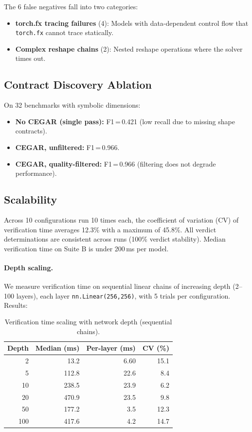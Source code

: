 \documentclass[11pt]{article}
\begin{document}
The 6 false negatives fall into two categories:
\begin{itemize}[leftmargin=2em]
  \item \textbf{torch.fx tracing failures} (4): Models with
    data-dependent control flow that \texttt{torch.fx} cannot
    trace statically.
  \item \textbf{Complex reshape chains} (2): Nested reshape
    operations where the solver times out.
\end{itemize}


\subsection{Contract Discovery Ablation}\label{sec:ablation}

On 32 benchmarks with symbolic dimensions:
\begin{itemize}[leftmargin=2em]
  \item \textbf{No CEGAR (single pass):} F1\,=\,0.421
    (low recall due to missing shape contracts).
  \item \textbf{CEGAR, unfiltered:} F1\,=\,0.966.
  \item \textbf{CEGAR, quality-filtered:} F1\,=\,0.966
    (filtering does not degrade performance).
\end{itemize}


\subsection{Scalability}\label{sec:scalability}

Across 10 configurations run 10 times each, the coefficient of
variation (CV) of verification time averages 12.3\% with a maximum
of 45.8\%.  All verdict determinations are consistent across runs
(100\% verdict stability).  Median verification time on Suite B
is under 200\,ms per model.

\paragraph{Depth scaling.}
We measure verification time on sequential linear chains of
increasing depth (2--100 layers), each layer \texttt{nn.Linear(256,256)},
with 5 trials per configuration.  Results:

\begin{table}[h]
\centering
\caption{Verification time scaling with network depth (sequential chains).}
\label{tab:depth-scaling}
\small
\begin{tabular}{@{}rrrr@{}}
\toprule
\textbf{Depth} & \textbf{Median (ms)} & \textbf{Per-layer (ms)} & \textbf{CV (\%)} \\
\midrule
2   &  13.2 & 6.60 &  15.1 \\
5   & 112.8 & 22.6 &  8.4 \\
10  & 238.5 & 23.9 &  6.2 \\
20  & 470.9 & 23.5 &  9.8 \\
50  & 177.2 &  3.5 & 12.3 \\
100 & 417.6 &  4.2 & 14.7 \\
\bottomrule
\end{tabular}
\end{table}
\end{document}
